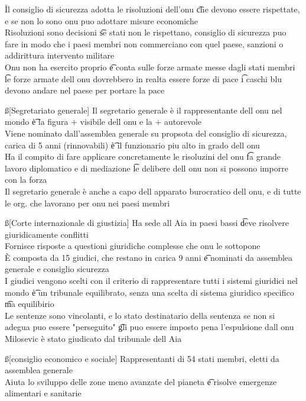 \documentclass[12pt]{article}
\begin{document}
\v

Il consiglio di sicurezza adotta le risoluzioni dell'onu \t che devono essere rispettate, e se non lo sono onu puo adottare misure economiche \\
Risoluzioni sono decisioni \t se stati non le rispettano, consiglio di sicurezza puo fare in modo che i paesi membri non commerciano con quel paese, sanzioni o addirittura intervento militare \\
Onu non ha esercito proprio \t e conta sulle forze armate messe dagli stati membri \t le forze armate dell onu dovrebbero in realta essere forze di pace \t i caschi blu devono andare nel paese per portare la pace

\ss[Segretariato generale]
Il segretario generale è il rappresentante dell onu nel mondo \t è la figura + visibile dell onu e la + autorevole \\
Viene nominato dall'assemblea generale su propsota del consiglio di sicurezza, carica di 5 anni (rinnovabili) \t è il funzionario piu alto in grado dell onu \\
Ha il compito di fare applicare concretamente le risoluzini del onu \t fa grande lavoro diplomatico e di mediazione \t le delibere dell onu non si possono imporre con la forza \\
Il segretario generale è anche a capo dell apparato burocratico dell onu, e di tutte le org. che lavorano per onu nei paesi membri

\ss[Corte internazionale di giustizia]
Ha sede all Aia in paesi bassi \t deve risolvere giuridicamente conflitti \\
Fornisce risposte a questioni giuridiche complesse che onu le sottopone \\
È composta da 15 giudici, che restano in carica 9 anni \t e nominati da assemblea generale e consiglio sicurezza \\
I giudici vengono scelti con il criterio di rappresentare tutti i sistemi giuridici nel mondo \t è un tribunale equilibrato, senza una scelta di sistema giuridico specifico \t ma equilibirio \\
Le sentenze sono vincolanti, e lo stato destinatario della sentenza se non si adegua puo essere "perseguito" \t gli puo essere imposto pena l'espulsione dall onu \\
Milosevic è stato giudicato dal tribunale dell Aia

\ss[consiglio economico e sociale]
Rappresentanti di 54 stati membri, eletti da assemblea generale \\
Aiuta lo sviluppo delle zone meno avanzate del pianeta \t e risolve emergenze alimentari e sanitarie
\end{document}
